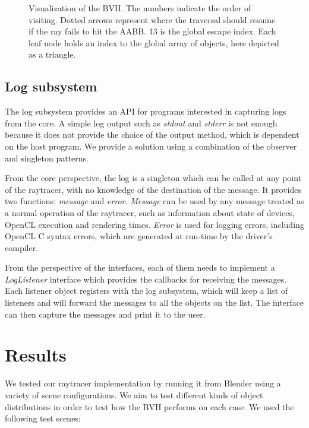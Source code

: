\documentclass{vgtc}
\begin{document}
\begin{figure}
\centering


\caption{Visualization of the BVH. The numbers indicate the order of
  visiting. Dotted arrows represent where the traversal should resume
  if the ray fails to hit the AABB. 13 is the global escape
  index. Each leaf node holds an index to the global array of objects,
  here depicted as a triangle.}
\label{fig:bvh}
\end{figure}


\subsection{Log subsystem}

The log subsystem provides an API for programs interested in capturing
logs from the core. A simple log output such as \emph{stdout} and
\emph{stderr} is not enough because it does not provide the choice of
the output method, which is dependent on the host program. We provide
a solution using a combination of the observer and singleton patterns.

From the core perspective, the log is a singleton which can be called
at any point of the raytracer, with no knowledge of the destination of
the message. It provides two functions: \emph{message} and
\emph{error}. \emph{Message} can be used by any message treated as a normal
operation of the raytracer, such as information about state of
devices, OpenCL execution and rendering times. \emph{Error} is used for
logging errors, including OpenCL C syntax errors, which are generated at
run-time by the driver's compiler.

From the perspective of the interfaces, each of them needs to implement
a \emph{LogListener} interface which provides the callbacks for
receiving the messages. Each listener object registers with the log
subsystem, which will keep a list of listeners and will forward the
messages to all the objects on the list. The interface can then
capture the messages and print it to the user.

\section{Results}
\label{sec:results}

We tested our raytracer implementation by running it from Blender using
a variety of scene configurations. We aim to test different kinds of
object distributions in order to test how the BVH performs on each
case. We used the following test scenes:
\end{document}

